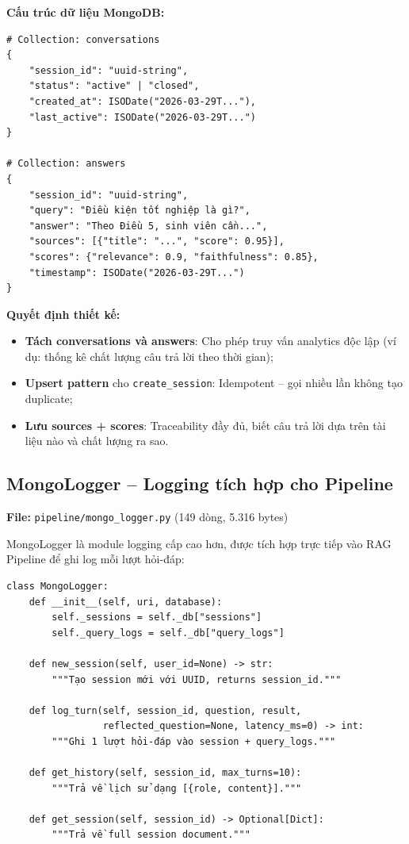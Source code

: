 \documentclass[../DoAn.tex]{subfiles}
\begin{document}
\textbf{Cấu trúc dữ liệu MongoDB:}
\begin{verbatim}
# Collection: conversations
{
    "session_id": "uuid-string",
    "status": "active" | "closed",
    "created_at": ISODate("2026-03-29T..."),
    "last_active": ISODate("2026-03-29T...")
}

# Collection: answers
{
    "session_id": "uuid-string",
    "query": "Điều kiện tốt nghiệp là gì?",
    "answer": "Theo Điều 5, sinh viên cần...",
    "sources": [{"title": "...", "score": 0.95}],
    "scores": {"relevance": 0.9, "faithfulness": 0.85},
    "timestamp": ISODate("2026-03-29T...")
}
\end{verbatim}

\textbf{Quyết định thiết kế:}
\begin{itemize}
    \item \textbf{Tách conversations và answers}: Cho phép truy vấn analytics độc lập (ví dụ: thống kê chất lượng câu trả lời theo thời gian);
    \item \textbf{Upsert pattern} cho \texttt{create\_session}: Idempotent -- gọi nhiều lần không tạo duplicate;
    \item \textbf{Lưu sources + scores}: Traceability đầy đủ, biết câu trả lời dựa trên tài liệu nào và chất lượng ra sao.
\end{itemize}

\subsection{MongoLogger -- Logging tích hợp cho Pipeline}
\textbf{File:} \texttt{pipeline/mongo\_logger.py} (149 dòng, 5.316 bytes)

MongoLogger là module logging cấp cao hơn, được tích hợp trực tiếp vào RAG Pipeline để ghi log mỗi lượt hỏi-đáp:
\begin{verbatim}
class MongoLogger:
    def __init__(self, uri, database):
        self._sessions = self._db["sessions"]
        self._query_logs = self._db["query_logs"]

    def new_session(self, user_id=None) -> str:
        """Tạo session mới với UUID, returns session_id."""

    def log_turn(self, session_id, question, result,
                 reflected_question=None, latency_ms=0) -> int:
        """Ghi 1 lượt hỏi-đáp vào session + query_logs."""

    def get_history(self, session_id, max_turns=10):
        """Trả về lịch sử dạng [{role, content}]."""

    def get_session(self, session_id) -> Optional[Dict]:
        """Trả về full session document."""
\end{verbatim}
\end{document}

